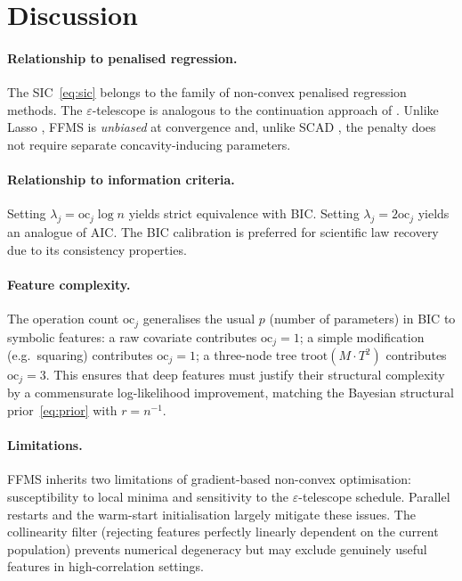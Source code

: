 \documentclass[12pt,a4paper]{article}
\newcommand{\oc}{\mathrm{oc}}
\begin{document}
\section{Discussion}
\label{sec:discussion}

\paragraph{Relationship to penalised regression.}
The SIC~\eqref{eq:sic} belongs to the family of non-convex penalised regression
methods.  The $\varepsilon$-telescope is analogous to the continuation approach
of \citet{Efron2004}.  Unlike Lasso \citep{Tibshirani1996}, FFMS is
\emph{unbiased} at convergence and, unlike SCAD \citep{Fan2001}, the penalty
does not require separate concavity-inducing parameters.

\paragraph{Relationship to information criteria.}
Setting $\lambda_j = \oc_j\log n$ yields strict equivalence with BIC.
Setting $\lambda_j = 2\oc_j$ yields an analogue of AIC.  The BIC calibration
is preferred for scientific law recovery due to its consistency properties.

\paragraph{Feature complexity.}
The operation count $\oc_j$ generalises the usual $p$ (number of parameters)
in BIC to symbolic features: a raw covariate contributes $\oc_j=1$; a simple
modification (e.g.\ squaring) contributes $\oc_j=1$; a three-node tree
$\mathrm{troot}(M \cdot T^2)$ contributes $\oc_j=3$.  This ensures that deep
features must justify their structural complexity by a commensurate log-likelihood
improvement, matching the Bayesian structural prior~\eqref{eq:prior} with
$r=n^{-1}$.

\paragraph{Limitations.}
FFMS inherits two limitations of gradient-based non-convex optimisation:
susceptibility to local minima and sensitivity to the $\varepsilon$-telescope
schedule.  Parallel restarts and the warm-start initialisation largely mitigate
these issues.  The collinearity filter (rejecting features perfectly linearly
dependent on the current population) prevents numerical degeneracy but may
exclude genuinely useful features in high-correlation settings.
\end{document}
